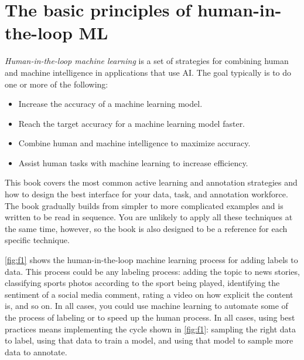 \documentclass[sigconf,nonacm,screen,pbalance]{acmart}
\begin{document}
\section{The basic principles of human-in-the-loop ML}
\emph{Human-in-the-loop machine learning}
is a set of strategies for combining human and machine intelligence in applications that use AI. The goal typically is to do one or more of the following:
\begin{itemize}
     \setlength{\itemindent}{-2em}
    \item Increase the accuracy of a machine learning model.
    \item Reach the target accuracy for a machine learning model faster.
    \item Combine human and machine intelligence to maximize accuracy.
    \item Assist human tasks with machine learning to increase efficiency. 
\end{itemize}

This book covers the most common active learning and annotation strategies and how to design the best interface for your data, task, and annotation workforce. The book gradually builds from simpler to more complicated examples and is written to be read in sequence. You are unlikely to apply all these techniques at the same time, however, so the book is also designed to be a reference for each specific technique.

\autoref{fig:f1} shows the human-in-the-loop machine learning process for adding labels to data. This process could be any labeling process: adding the topic to news stories, classifying sports photos according to the sport being played, identifying the sentiment of a social media comment, rating a video on how explicit the content is, and so on. In all cases, you could use machine learning to automate some of the process of labeling or to speed up the human process. In all cases, using best practices means implementing the cycle shown in \autoref{fig:f1}: sampling the right data to label, using that data to train a model, and using that model to sample more data to annotate.
\end{document}
